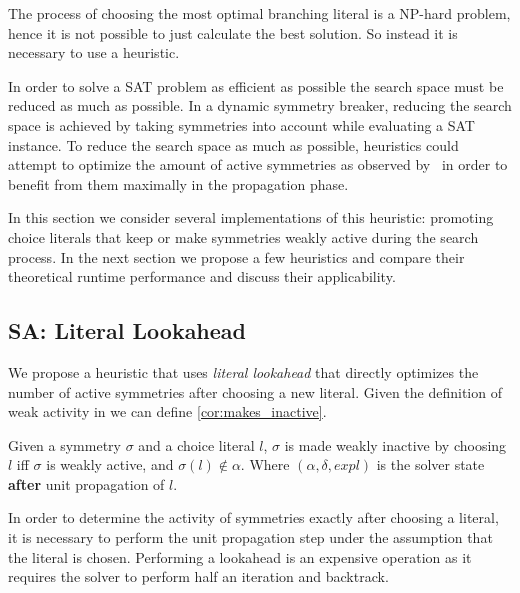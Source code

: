 
The process of choosing the most optimal branching literal is a NP-hard problem, hence it is not
possible to
just calculate the best solution. So instead it is necessary to use a heuristic.

In order to solve a SAT problem as efficient as possible the search space must be reduced as much as
possible.
In a dynamic symmetry breaker, reducing the search space
is achieved by taking symmetries into account while evaluating a SAT instance.
To reduce the search space as much as possible, heuristics could attempt to optimize the amount of
active symmetries as observed by~\cite{devriendt2012symmetry} in order to benefit from them
maximally in the propagation phase.

In this section we consider several implementations of this heuristic: promoting choice literals
that keep or make symmetries weakly active during the search process.
In the next section we propose a few heuristics and compare their theoretical runtime performance
and discuss their applicability.

\subsection{SA: Literal Lookahead}
	We propose a heuristic that uses \emph{literal lookahead} that directly optimizes the number of
	active symmetries after choosing a new literal.
	Given the definition of weak activity in \cite{devriendt2012symmetry} we can define
	\cref{cor:makes_inactive}.\\

	\begin{corollary}
		\label{cor:makes_inactive}
		Given a symmetry $\sigma$ and a choice literal $l$,
		$\sigma$ is made weakly inactive by choosing $l$ iff
		$\sigma$ is weakly active, and $\sigma(l) \notin \alpha$.
		Where $(\alpha,\delta,\textit{expl})$ is the solver state \textbf{after} unit propagation of $l$.
	\end{corollary}

	In order to determine the activity of symmetries exactly after choosing a literal,
	it is necessary to perform the unit propagation step under the assumption that the literal is chosen.
	Performing a lookahead is an expensive operation as it requires the solver to perform half an
	iteration and backtrack.

